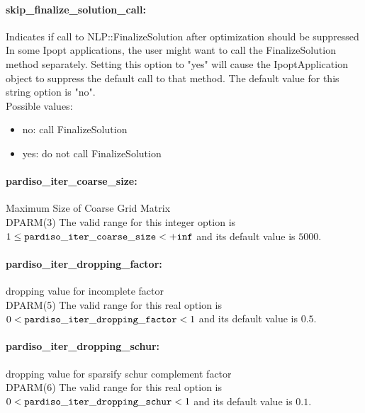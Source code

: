 \paragraph{skip\_finalize\_solution\_call:}\label{sec:skip_finalize_solution_call} Indicates if call to NLP::FinalizeSolution after optimization should be suppressed $\;$ \\
 In some Ipopt applications, the user might want
to call the FinalizeSolution method separately. 
Setting this option to "yes" will cause the
IpoptApplication object to suppress the default
call to that method.
The default value for this string option is "no".
\\ 
Possible values:
\begin{itemize}
   \item no: call FinalizeSolution
   \item yes: do not call FinalizeSolution
\end{itemize}

\paragraph{pardiso\_iter\_coarse\_size:}\label{sec:pardiso_iter_coarse_size} Maximum Size of Coarse Grid Matrix $\;$ \\
 DPARM(3) The valid range for this integer option is
$1 \le {\tt pardiso\_iter\_coarse\_size } <  {\tt +inf}$
and its default value is $5000$.


\paragraph{pardiso\_iter\_dropping\_factor:}\label{sec:pardiso_iter_dropping_factor} dropping value for incomplete factor $\;$ \\
 DPARM(5) The valid range for this real option is 
$0 <  {\tt pardiso\_iter\_dropping\_factor } <  1$
and its default value is $0.5$.


\paragraph{pardiso\_iter\_dropping\_schur:}\label{sec:pardiso_iter_dropping_schur} dropping value for sparsify schur complement factor $\;$ \\
 DPARM(6) The valid range for this real option is 
$0 <  {\tt pardiso\_iter\_dropping\_schur } <  1$
and its default value is $0.1$.



